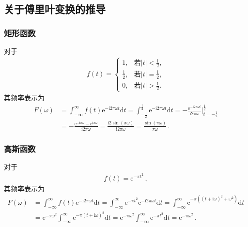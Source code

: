 \subsection{关于傅里叶变换的推导}\label{sub:关于傅里叶变换的推导}
\subsubsection*{矩形函数}
对于
\begin{align}
    f(t)=\left\{\begin{array}{ll}
        1,                        & \displaystyle\text{若}|t|<\frac{1}{2}, \\
        \displaystyle\frac{1}{2}, & \displaystyle\text{若}|t|=\frac{1}{2}, \\
        0,                        & \displaystyle\text{若}|t|>\frac{1}{2}.
    \end{array}\right.
\end{align}
其频率表示为
\begin{align}
    F(\omega) & =\int_{-\infty}^{\infty}f(t)\mathrm{e}^{-\mathrm{i}2\pi\omega t}\mathrm{d}t
    =\int_{-\frac{1}{2}}^{\frac{1}{2}}\mathrm{e}^{-\mathrm{i}2\pi\omega t}\mathrm{d}t
    =-\frac{\mathrm{e}^{-\mathrm{i}2\pi\omega t}}{\mathrm{i}2\pi\omega}\bigg|_{t=-\frac{1}{2}}^{\frac{1}{2}}\nonumber \\
              & =-\frac{\mathrm{e}^{-\mathrm{i}\pi\omega}-\mathrm{e}^{\mathrm{i}\pi\omega}}{\mathrm{i}2\pi\omega}
    =\frac{\mathrm{i}2\sin(\pi\omega)}{\mathrm{i}2\pi\omega}
    =\frac{\sin(\pi\omega)}{\pi\omega}\, .
\end{align}

\subsubsection*{高斯函数}
对于
\begin{align}
    f(t)=\mathrm{e}^{-\pi t^2}\, ,
\end{align}
其频率表示为
\begin{align}
    F(\omega) & =\int_{-\infty}^{\infty}f(t)\mathrm{e}^{-\mathrm{i}2\pi\omega t}\mathrm{d}t
    =\int_{-\infty}^{\infty}\mathrm{e}^{-\pi t^2}\mathrm{e}^{-\mathrm{i}2\pi\omega t}\mathrm{d}t
    =\int_{-\infty}^{\infty}\mathrm{e}^{-\pi((t+\mathrm{i}\omega)^2+\omega^2)}\mathrm{d}t\nonumber                  \\
              & =\mathrm{e}^{-\pi\omega^2}\int_{-\infty}^{\infty}\mathrm{e}^{-\pi(t+\mathrm{i}\omega)^2}\mathrm{d}t
    =\mathrm{e}^{-\pi\omega^2}\int_{-\infty}^{\infty}\mathrm{e}^{-\pi t^2}\mathrm{d}t
    =\mathrm{e}^{-\pi\omega^2}\, .
\end{align}
